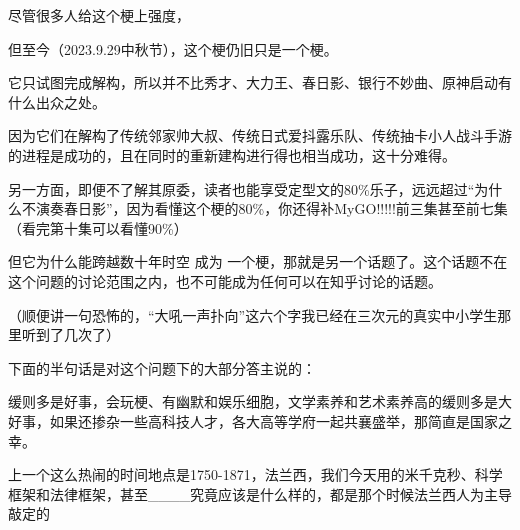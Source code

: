 \begin{zhihuanswer}
尽管很多人给这个梗上强度，

但至今（2023.9.29中秋节），这个梗仍旧只是一个梗。

它只试图完成解构，所以并不比秀才、大力王、春日影、银行不妙曲、原神启动有什么出众之处。

因为它们在解构了传统邻家帅大叔、传统日式爱抖露乐队、传统抽卡小人战斗手游的进程是成功的，且在同时的重新建构进行得也相当成功，这十分难得。

另一方面，即便不了解其原委，读者也能享受定型文的80\%乐子，远远超过``为什么不演奏春日影''，因为看懂这个梗的80\%，你还得补MyGO!!!!!前三集甚至前七集（看完第十集可以看懂90\%）

但它为什么能跨越数十年时空 成为
一个梗，那就是另一个话题了。这个话题不在这个问题的讨论范围之内，也不可能成为任何可以在知乎讨论的话题。

（顺便讲一句恐怖的，``大吼一声扑向''这六个字我已经在三次元的真实中小学生那里听到了几次了）

下面的半句话是对这个问题下的大部分答主说的：

缓则多是好事，会玩梗、有幽默和娱乐细胞，文学素养和艺术素养高的缓则多是大好事，如果还掺杂一些高科技人才，各大高等学府一起共襄盛举，那简直是国家之幸。

上一个这么热闹的时间地点是1750-1871，法兰西，我们今天用的米千克秒、科学框架和法律框架，甚至\_\_\_\_究竟应该是什么样的，都是那个时候法兰西人为主导敲定的
\end{zhihuanswer}
